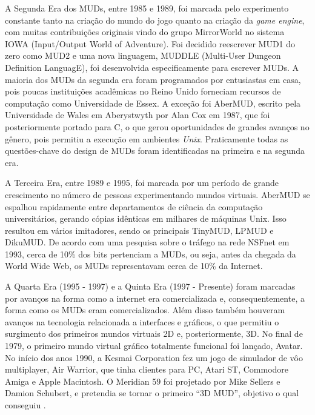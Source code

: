 A Segunda Era dos MUDs, entre 1985 e 1989, foi marcada pelo experimento constante tanto na criação do 
mundo do jogo quanto na criação da \textit{game engine}, com muitas contribuições originais vindo do 
grupo MirrorWorld no sistema IOWA (Input/Output World of Adventure). Foi decidido reescrever MUD1 do 
zero como MUD2 e uma nova linguagem, MUDDLE (Multi-User Dungeon Definition LanguagE), foi desenvolvida 
especificamente para escrever MUDs. A maioria dos MUDs da segunda era foram programados por entusiastas 
em casa, pois poucas instituições acadêmicas no Reino Unido forneciam recursos de computação como 
Universidade de Essex. A exceção foi AberMUD, escrito pela Universidade de Wales em Aberystwyth por 
Alan Cox em 1987, que foi posteriormente portado para C, o que gerou oportunidades de grandes 
avanços no gênero, pois permitiu a execução em ambientes \textit{Unix}. Praticamente todas as 
questões-chave do design de MUDs foram identificadas na primeira e na segunda era.

A Terceira Era, entre 1989 e 1995, foi marcada por um período de grande crescimento no número de 
pessoas experimentando mundos virtuais. AberMUD se espalhou rapidamente entre departamentos de ciência 
da computação universitários, gerando cópias idênticas em milhares de máquinas Unix. Isso resultou em 
vários imitadores, sendo os principais TinyMUD, LPMUD e DikuMUD. De acordo com uma pesquisa sobre o 
tráfego na rede NSFnet em 1993, cerca de 10\% dos bits pertenciam a MUDs, ou seja, antes da chegada da 
World Wide Web, os MUDs representavam cerca de 10\% da Internet.

A Quarta Era (1995 - 1997) e a Quinta Era (1997 - Presente) foram marcadas por avanços na forma como a 
internet era comercializada e, consequentemente, a forma como os MUDs eram comercializados. Além disso 
também houveram avanços na tecnologia relacionada a interfaces e gráficos, o que permitiu o surgimento 
dos primeiros mundos virtuais 2D e, posteriormente, 3D. No final de 1979, o primeiro mundo virtual 
gráfico totalmente funcional foi lançado, Avatar. No início dos anos 1990, a Kesmai Corporation fez um jogo de simulador de vôo multiplayer, Air Warrior, 
que tinha clientes para PC, Atari ST, Commodore Amiga e Apple Macintosh. O Meridian 59 foi projetado por 
Mike Sellers e Damion Schubert, e pretendia se tornar o primeiro “3D MUD”, objetivo o qual conseguiu \cite{bartle2004designing}.